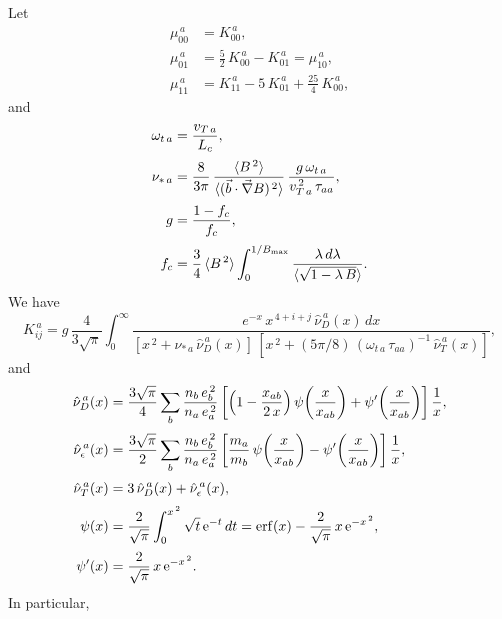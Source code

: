 \documentclass[12pt]{article}
\begin{document}
Let
\begin{align}
\mu_{00}^{\,a} &= K_{00}^{\,a},\\[0.5ex]
\mu_{01}^{\,a} &= \frac{5}{2}\,K_{00}^{\,a}- K_{01}^{\,a}=\mu_{10}^{\,a},\\[0.5ex]
\mu_{11}^{\,a} &= K_{11}^{\,a} - 5\,K_{01}^{\,a}+\frac{25}{4}\,K_{00}^{\,a},
\end{align}
and
\begin{align}
\omega_{t\,a} &=\frac{v_{T\,a}}{L_c},\\[0.5ex]
\nu_{\ast\,a}&= \frac{8}{3\pi}\,\frac{\langle B^{\,2}\rangle}{\langle (\vec{b}\cdot\vec{\nabla}B)^{\,2}\rangle}\,\frac{g\,\omega_{t\,a}}{v_{T\,a}^{\,2}\,\tau_{aa}},\\[0.5ex]
g &= \frac{1-f_c}{f_c},\\[0.5ex]
f_c &= \frac{3}{4}\,\langle B^{\,2}\rangle\int_{0}^{1/B_{\rm max}}\frac{\lambda\,d\lambda}{\langle\sqrt{1-\lambda\,B}\rangle}.
\end{align}
We have
\begin{equation}
K_{ij}^{\,a} = g\,\frac{4}{3\sqrt{\pi}}\int_0^\infty
\frac{e^{-x}\,x^{\,4+i+j}\,\hat{\nu}_D^{\,a}(x)\,dx}{[x^{\,2}+\nu_{\ast\,a}\,\hat{\nu}_D^{\,a}(x)]\,[x^{\,2}+(5\pi/8)\,(\omega_{t\,a}\,\tau_{aa})^{-1}\,\hat{\nu}_T^{\,a}(x)]},
\end{equation}
and 
\begin{align}
\hat{\nu}_D^{\,a}(x)&=\frac{3\sqrt{\pi}}{4}\sum_b 
\frac{n_b\,e_b^{\,2}}{n_a\,e_a^{\,2}}\left[\left(1-\frac{x_{ab}}{2\,x}\right)\psi\!\left(\frac{x}{x_{ab}}\right)
+\psi'\!\left(\frac{x}{x_{ab}}\right)\right]\frac{1}{x},\\[0.5ex]
\hat{\nu}_\epsilon^{\,a}(x)&=\frac{3\sqrt{\pi}}{2}\sum_b 
\frac{n_b\,e_b^{\,2}}{n_a\,e_a^{\,2}}\left[\frac{m_a}{m_b}\,\psi\!\left(\frac{x}{x_{ab}}\right)
-\psi'\!\left(\frac{x}{x_{ab}}\right)\right]\frac{1}{x},\\[0.5ex]
\hat{\nu}_T^{\,a}(x) &= 3\,\hat{\nu}_D^{\,a}(x)+\hat{\nu}_{\epsilon}^{\,a}(x),\\[0.5ex]
\psi(x) &=\frac{2}{\sqrt{\pi}}\int_0^{x^{\,2}}\sqrt{t}\,{\rm e}^{-t}\,dt = {\rm erf}(x)-\frac{2}{\sqrt{\pi}}\,x\,{\rm e}^{-x^{\,2}},\\[0.5ex]
\psi'(x)&= \frac{2}{\sqrt{\pi}}\,x\,{\rm e}^{-x^{\,2}}.
\end{align}
In particular,
\end{document}
